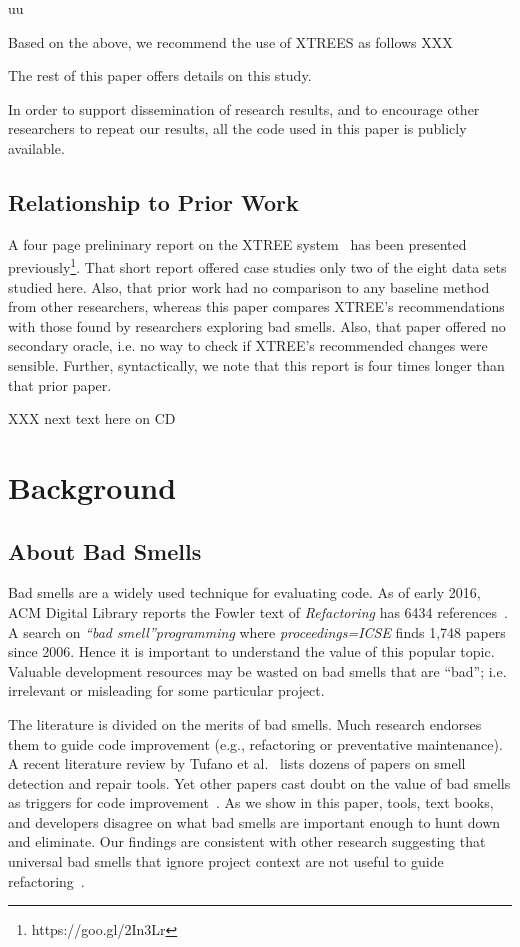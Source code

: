 uu \documentclass[final,twocolumn,5p]{elsarticle}
\theoremstyle{break}
\begin{document}
Based on the above, we recommend the use of XTREES as follows XXX

  The rest of this paper offers details on this study.  
  
  
  In order to support dissemination
  of research results, and to encourage other researchers to repeat our results,
  all the code used in this paper is publicly available.
  
  \subsection{Relationship to Prior Work }
A four page prelininary report on the XTREE system~\cite{krishna2015actionable} has been presented previously\footnote{https://goo.gl/2In3Lr}. That short report offered case studies only two  of
the eight data sets studied here. Also, that prior work had
no comparison to any baseline
method from other researchers, whereas this paper compares XTREE's recommendations
with those found by researchers exploring bad smells.
Also, that paper offered
no secondary oracle, i.e. no way to check if XTREE's recommended changes were sensible.
Further, syntactically, we note that this report is four times longer than that prior paper.


XXX next text here on CD

\section{Background}
\subsection{About Bad Smells}

Bad smells are a widely used technique for evaluating code. As of  early 2016, ACM Digital Library reports 
the Fowler text of {\em Refactoring} has 6434 references~\cite{fowler99}. A search  on {\em ``bad smell''programming} 
where {\em proceedings=ICSE} finds 1,748 papers since 2006.
Hence it is important to understand the value of
this popular topic.  
Valuable development resources may be wasted on bad smells that are ``bad''; i.e. 
 irrelevant or misleading
for some particular project.


The literature is divided on the merits of bad smells.
Much research endorses them to guide
code improvement (e.g., refactoring or preventative maintenance). A recent literature review by Tufano et al.~\cite{Tufano2015}  
lists dozens of papers on smell detection and repair tools. 
Yet
other papers cast doubt on the value of bad smells
as triggers for code improvement~\cite{Mantyla2004,Yamashita2013,Sjoberg2013}. 
As we show in this paper,  
 tools, text books, and developers disagree on what bad smells
are important enough to hunt down and eliminate. Our findings
are consistent with other research suggesting that universal bad
smells that ignore project context are not useful to guide refactoring~\cite{Mantyla2004,Yamashita2013,Sjoberg2013}.
\end{document}
